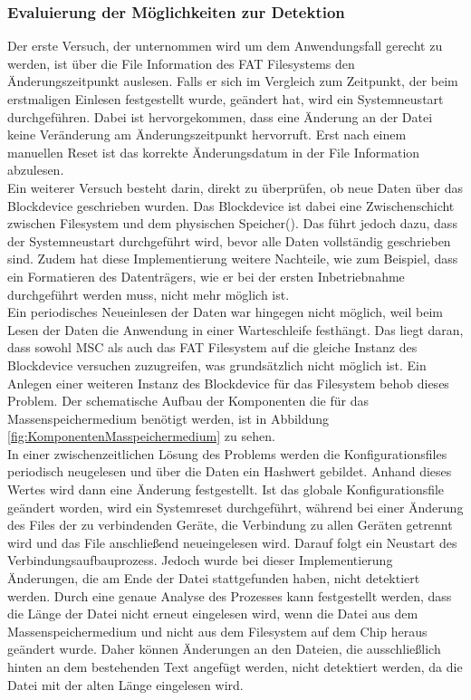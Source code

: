 \subsubsection{Evaluierung der Möglichkeiten zur Detektion}
Der erste Versuch, der unternommen wird um dem Anwendungsfall gerecht zu werden, ist über die File Information des \ac{FAT} Filesystems den Änderungszeitpunkt auslesen. Falls er sich im Vergleich zum Zeitpunkt, der beim erstmaligen Einlesen festgestellt wurde, geändert hat, wird ein Systemneustart durchgeführen. Dabei ist hervorgekommen, dass eine Änderung an der Datei keine Veränderung am Änderungszeitpunkt hervorruft. Erst nach einem manuellen Reset ist das korrekte Änderungsdatum in der File Information abzulesen. \\
Ein weiterer Versuch besteht darin, direkt zu überprüfen, ob neue Daten über das Blockdevice geschrieben wurden. Das Blockdevice ist dabei eine Zwischenschicht zwischen Filesystem und dem physischen Speicher(\cite{NRF_Block_device}). Das führt jedoch dazu, dass der Systemneustart durchgeführt wird, bevor alle Daten vollständig geschrieben sind. Zudem hat diese Implementierung weitere Nachteile, wie zum Beispiel, dass ein Formatieren des Datenträgers, wie er bei der ersten Inbetriebnahme durchgeführt werden muss, nicht mehr möglich ist. \\
Ein periodisches Neueinlesen der Daten war hingegen nicht möglich, weil beim Lesen der Daten die Anwendung in einer Warteschleife festhängt. Das liegt daran, dass sowohl \ac{MSC} als auch das \ac{FAT} Filesystem auf die gleiche Instanz des Blockdevice versuchen zuzugreifen, was grundsätzlich nicht möglich ist. Ein Anlegen einer weiteren Instanz des Blockdevice für das Filesystem behob dieses Problem. Der schematische Aufbau der Komponenten die für das Massenspeichermedium benötigt werden, ist in Abbildung \ref{fig:KomponentenMasspeichermedium} zu sehen.\\
In einer zwischenzeitlichen Lösung des Problems werden die Konfigurationsfiles periodisch neugelesen und über die Daten ein Hashwert gebildet. Anhand dieses Wertes wird dann eine Änderung festgestellt. Ist das globale Konfigurationsfile geändert worden, wird ein Systemreset durchgeführt, während bei einer Änderung des Files der zu verbindenden Geräte, die Verbindung zu allen Geräten getrennt wird und das File anschließend neueingelesen wird. Darauf folgt ein Neustart des Verbindungsaufbauprozess. Jedoch wurde bei dieser Implementierung Änderungen, die am Ende der Datei stattgefunden haben, nicht detektiert werden. Durch eine genaue Analyse des Prozesses kann festgestellt werden, dass die Länge der Datei nicht erneut eingelesen wird, wenn die Datei aus dem Massenspeichermedium und nicht aus dem Filesystem auf dem Chip heraus geändert wurde. Daher können Änderungen an den Dateien, die ausschließlich hinten an dem bestehenden Text angefügt werden, nicht detektiert werden, da die Datei mit der alten Länge eingelesen wird.

